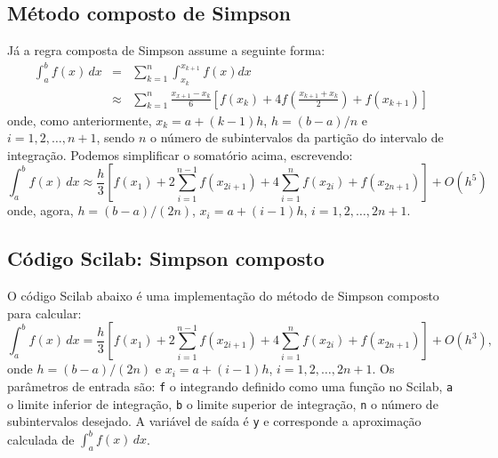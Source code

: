 
\fi

\subsection{Método composto de Simpson}
Já a regra composta de Simpson assume a seguinte forma:
\begin{eqnarray*}
  \int_{a}^b f(x)\,dx &=& \sum_{k=1}^{n} \int_{x_k}^{x_{k+1}} f(x)dx \\
  &\approx& \sum_{k=1}^{n} \frac{x_{x+1}-x_k}{6}\left[f(x_k) + 4f\left(\frac{x_{k+1}+x_k}{2}\right)+f(x_{k+1})\right]
\end{eqnarray*}
onde, como anteriormente, $x_k = a + (k-1)h$, $h = (b-a)/n$ e $i = 1,2,\dotsc,n+1$, sendo $n$ o número de subintervalos da partição do intervalo de integração. Podemos simplificar o somatório acima, escrevendo:
\begin{equation*}
  \int_{a}^b f(x)\,dx \approx \frac{h}{3}\left[f(x_1) + 2\sum_{i=1}^{n-1} f(x_{2i+1}) + 4\sum_{i=1}^{n} f(x_{2i}) + f(x_{2n+1})\right] + O(h^5)
\end{equation*}
onde, agora, $h = (b-a)/(2n)$, $x_i = a + (i-1)h$, $i=1,2,\dotsc,2n+1$.

\ifisscilab
\subsection{Código Scilab: Simpson composto}
O código Scilab abaixo é uma implementação do método de Simpson composto para calcular:
\begin{equation*}
  \int_a^b f(x)\,dx = \frac{h}{3}\left[f(x_1) + 2\sum_{i=1}^{n-1} f(x_{2i+1}) + 4\sum_{i=1}^{n} f(x_{2i}) + f(x_{2n+1})\right] + O(h^3),
\end{equation*}
onde $h = (b-a)/(2n)$ e $x_i = a + (i-1)h$, $i=1,2,\dotsc,2n+1$. Os parâmetros de entrada são: \verb+f+ o integrando definido como uma função no Scilab, \verb+a+ o limite inferior de integração, \verb+b+ o limite superior de integração, \verb+n+ o número de subintervalos desejado. A variável de saída é \verb+y+ e corresponde a aproximação calculada de $\int_a^b f(x)\, dx$.

\fi
\ifisoctave

